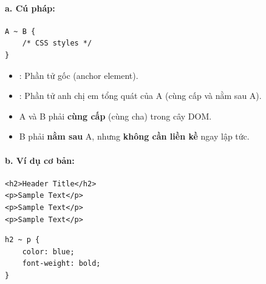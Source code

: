 \paragraph{a. Cú pháp:}
\begin{codeWindow}
\begin{lstlisting}[language=CSS3]
A ~ B {
    /* CSS styles */
}
\end{lstlisting}
\end{codeWindow}

\begin{itemize}[leftmargin=1.5em, itemsep=2pt, parsep=0pt]
    \item {}: Phần tử gốc (anchor element).
    \item {}: Phần tử anh chị em tổng quát của A (cùng cấp và nằm sau A).
\end{itemize}

\begin{noteBox}
\begin{itemize}[leftmargin=1.5em, itemsep=2pt, parsep=0pt]
    \item A và B phải \textbf{cùng cấp} (cùng cha) trong cây DOM.
    \item B phải \textbf{nằm sau} A, nhưng \textbf{không cần liền kề} ngay lập tức.
\end{itemize}
\end{noteBox}

\paragraph{b. Ví dụ cơ bản:}
\begin{codeWindow}
\begin{lstlisting}[language=HTML5]
<h2>Header Title</h2>
<p>Sample Text</p>
<p>Sample Text</p>
<p>Sample Text</p>
\end{lstlisting}

\begin{lstlisting}[language=CSS3]
h2 ~ p {
    color: blue;
    font-weight: bold;
}
\end{lstlisting}
\end{codeWindow}

